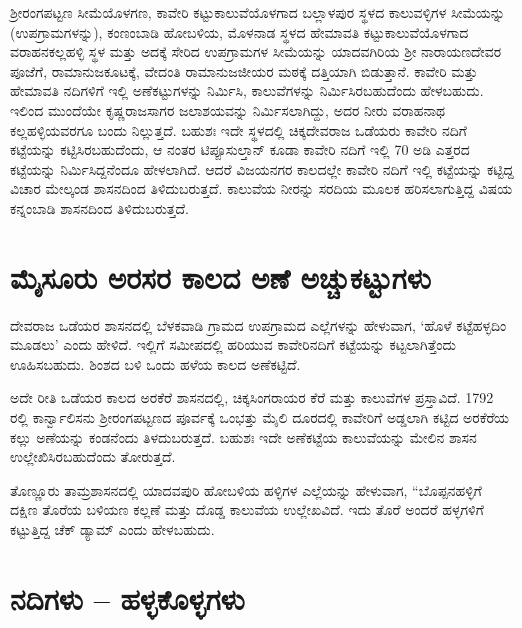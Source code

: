 ಶ‍್ರೀರಂಗಪಟ್ಟಣ ಸೀಮೆಯೊಳಗಣ, ಕಾವೇರಿ ಕಟ್ಟುಕಾಲುವೆಯೊಳಗಾದ ಬಲ್ಲಾಳಪುರ ಸ್ಥಳದ ಕಾಲುವಳ್ಳಿಗಳ ಸೀಮೆಯನ್ನು (ಉಪಗ್ರಾಮಗಳನ್ನು), ಕಂಣಂಬಾಡಿ ಹೋಬಳಿಯ, ಮೊಳನಾಡ ಸ್ಥಳದ ಹೇಮಾವತಿ ಕಟ್ಟುಕಾಲುವೆಯೊಳಗಾದ ವರಾಹನಕಲ್ಲಹಳ್ಳಿ ಸ್ಥಳ ಮತ್ತು ಅದಕ್ಕೆ ಸೇರಿದ ಉಪಗ್ರಾಮಗಳ ಸೀಮೆಯನ್ನು ಯಾದವಗಿರಿಯ ಶ‍್ರೀ ನಾರಾಯಣದೇವರ ಪೂಜೆಗೆ, ರಾಮಾನುಜಕೂಟಕ್ಕೆ, ವೇದಂತಿ ರಾಮಾನುಜಜೀಯರ ಮಠಕ್ಕೆ ದತ್ತಿಯಾಗಿ ಬಿಡುತ್ತಾನೆ. ಕಾವೇರಿ ಮತ್ತು ಹೇಮಾವತಿ ನದಿಗಳಿಗೆ ಇಲ್ಲಿ ಅಣೆಕಟ್ಟುಗಳನ್ನು ನಿರ್ಮಿಸಿ, ಕಾಲುವೆಗಳನ್ನು ನಿರ್ಮಿಸಿರಬಹುದೆಂದು ಹೇಳಬಹುದು. ಇಲಿಂದ ಮುಂದೆಯೇ ಕೃಷ್ಣರಾಜಸಾಗರ ಜಲಾಶಯವನ್ನು ನಿರ್ಮಿಸಲಾಗಿದ್ದು, ಅದರ ನೀರು ವರಾಹನಾಥ ಕಲ್ಲಹಳ್ಳಿಯವರಗೂ ಬಂದು ನಿಲ್ಲುತ್ತದೆ. ಬಹುಶಃ ಇದೇ ಸ್ಥಳದಲ್ಲಿ ಚಿಕ್ಕದೇವರಾಜ ಒಡೆಯರು ಕಾವೇರಿ ನದಿಗೆ ಕಟ್ಟೆಯನ್ನು ಕಟ್ಟಿಸಿರಬಹುದೆಂದು, ಆ ನಂತರ ಟಿಪ್ಪೂಸುಲ್ತಾನ್​ ಕೂಡಾ ಕಾವೇರಿ ನದಿಗೆ ಇಲ್ಲಿ 70 ಅಡಿ ಎತ್ತರದ ಕಟ್ಟೆಯನ್ನು ನಿರ್ಮಿಸಿದ್ದನೆಂದೂ ಹೇಳಲಾಗಿದೆ. ಆದರೆ ವಿಜಯನಗರ ಕಾಲದಲ್ಲೇ ಕಾವೇರಿ ನದಿಗೆ ಇಲ್ಲಿ ಕಟ್ಟೆಯನ್ನು ಕಟ್ಟಿದ್ದ ವಿಚಾರ ಮೇಲ್ಕಂಡ ಶಾಸನದಿಂದ ತಿಳಿದುಬರುತ್ತದೆ. ಕಾಲುವೆಯ ನೀರನ್ನು ಸರದಿಯ ಮೂಲಕ ಹರಿಸಲಾಗುತ್ತಿದ್ದ ವಿಷಯ ಕನ್ನಂಬಾಡಿ ಶಾಸನದಿಂದ ತಿಳಿದುಬರುತ್ತದೆ.


\section{ಮೈಸೂರು ಅರಸರ ಕಾಲದ ಅಣೆ ಅಚ್ಚುಕಟ್ಟುಗಳು}

ದೇವರಾಜ ಒಡೆಯರ ಶಾಸನದಲ್ಲಿ ಬೆಳಕವಾಡಿ ಗ್ರಾಮದ ಉಪಗ್ರಾಮದ ಎಲ್ಲೆಗಳನ್ನು ಹೇಳುವಾಗ, ‘ಹೊಳೆ ಕಟ್ಟೆಹಳ್ಳದಿಂ ಮೂಡಲು’ ಎಂದು ಹೇಳಿದೆ. ಇಲ್ಲಿಗೆ ಸಮೀಪದಲ್ಲಿ ಹರಿಯುವ ಕಾವೇರಿನದಿಗೆ ಕಟ್ಟೆಯನ್ನು ಕಟ್ಟಲಾಗಿತ್ತೆಂದು ಊಹಿಸಬಹುದು. ಶಿಂಶದ ಬಳಿ ಒಂದು ಹಳೆಯ ಕಾಲದ ಅಣೆಕಟ್ಟಿದೆ.

ಅದೇ ರೀತಿ ಒಡೆಯರ ಕಾಲದ ಅರಕೆರೆ ಶಾಸನದಲ್ಲಿ, ಚಿಕ್ಕಸಿಂಗರಾಯರ ಕೆರೆ ಮತ್ತು ಕಾಲುವೆಗಳ ಪ್ರಸ್ತಾವಿದೆ. 1792 ರಲ್ಲಿ ಕಾರ್ನ್ವಾಲಿಸನು ಶ‍್ರೀರಂಗಪಟ್ಟಣದ ಪೂರ್ವಕ್ಕೆ ಒಂಭತ್ತು ಮೈಲಿ ದೂರದಲ್ಲಿ ಕಾವೇರಿಗೆ ಅಡ್ಡಲಾಗಿ ಕಟ್ಟಿದ ಅರಕೆರೆಯ ಕಲ್ಲು ಅಣೆಯನ್ನು ಕಂಡನೆಂದು ತಿಳದುಬರುತ್ತದೆ. ಬಹುಶಃ ಇದೇ ಅಣೆಕಟ್ಟೆಯ ಕಾಲುವೆಯನ್ನು ಮೇಲಿನ ಶಾಸನ ಉಲ್ಲೇಖಿಸಿರಬಹುದೆಂದು ತೋರುತ್ತದೆ.

ತೊಣ್ಣೂರು ತಾಮ್ರಶಾಸನದಲ್ಲಿ ಯಾದವಪುರಿ ಹೋಬಳಿಯ ಹಳ್ಳಿಗಳ ಎಲ್ಲೆಯನ್ನು ಹೇಳುವಾಗ, “ಬೊಪ್ಪನಹಳ್ಳಿಗೆ ದಕ್ಷಿಣ ತೊರೆಯ ಬಳಿಯಣ ಕಲ್ಲಣೆ ಮತ್ತು ದೊಡ್ಡ ಕಾಲುವೆಯ ಉಲ್ಲೇಖವಿದೆ. ಇದು ತೊರೆ ಅಂದರೆ ಹಳ್ಳಗಳಿಗೆ ಕಟ್ಟುತ್ತಿದ್ದ ಚೆಕ್​ ಡ್ಯಾಮ್ ಎಂದು ಹೇಳಬಹುದು.


\section{ನದಿಗಳು – ಹಳ್ಳಕೊಳ್ಳಗಳು}

